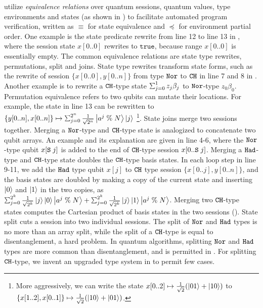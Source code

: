\qafny utilize \emph{equivalence relations} over quantum sessions, quantum values, type environments and states (as shown in ) to facilitate automated program verification, written as $\equiv$ for state equivalence and $\preceq$ for environment partial order. One example is the state predicate rewrite from line 12 to line 13 in , where the session state $x[0..0]$ rewrites to $\texttt{true}$, because range $x[0..0]$ is essentially empty.
The common equivalence relations are state type rewrites, permutations, split and joins. 
State type rewrites transform state forms, such as the rewrite of session $\{x[0..0],y[0..n]\}$ from type $\texttt{Nor}$ to $\texttt{CH}$ in line 7 and 8 in . Another example is to rewrite a $\texttt{CH}$-type state $\ssum{j=0}{1}{z_j\beta_j}$ to $\texttt{Nor}$-type ${z_0\beta_0}$. Permutation equivalence refers to two qubits can mutate their locations. For example, the state in line 13 can be rewritten to $\{y[0..n],x[0..n]\} \mapsto \scha{2^{n}}{\frac{1}{\sqrt{2^{n}}}}{a^{j}\;\%\;N}{\ket{j}}$ \footnote{More aggressively, we can write the state $x[0..2]\mapsto \frac{1}{\sqrt{2}}(\left\vert{01}\right\rangle+\left\vert{10}\right\rangle)$ to $\{x[1..2],x[0..1]\}\mapsto \frac{1}{\sqrt{2}}(\left\vert{10}\right\rangle+\left\vert{01}\right\rangle)$.}.
State joins merge two sessions together. Merging a $\texttt{Nor}$-type and $\texttt{CH}$-type state is analogized to concatenate two qubit arrays.
An example and its explanation are given in  line 4-6, 
where the $\texttt{Nor}$-type qubit $x[\texttt{S}\;j]$ is added to the end of $\texttt{CH}$-type session $x[0..\texttt{S}\;j]$.
Merging a $\texttt{Had}$-type and $\texttt{CH}$-type state doubles the $\texttt{CH}$-type basis states. 
In each loop step in  line 9-11, we add the $\texttt{Had}$ type qubit $x[j]$ to $\texttt{CH}$ type session $\{x[0..j],y[0..n]\}$, and the basis states are doubled by making a copy of the current state and inserting $\left\vert{0}\right\rangle$ and $\left\vert{1}\right\rangle$ in the two copies, as $\scha{2^k}{\frac{1}{\sqrt{2^k}}}{j}{\ket{0}\ket{a^{j}\;\%\;N}}+\scha{2^k}{\frac{1}{\sqrt{2^k}}}{j}{\ket{1}\ket{a^{j}\;\%\;N}}$.
Merging two $\texttt{CH}$-type states computes the Cartesian product of basis states in the two sessions ().
State split cuts a session into two individual sessions. The split of $\texttt{Nor}$ and $\texttt{Had}$ types is no more than an array split, while the split of a $\texttt{CH}$-type is equal to disentanglement, a hard problem. In quantum algorithms, splitting $\texttt{Nor}$ and $\texttt{Had}$ types are more common than disentanglement, and is permitted in \qafny. For splitting $\texttt{CH}$-type, we invent an upgraded type system in  to permit few cases. 


